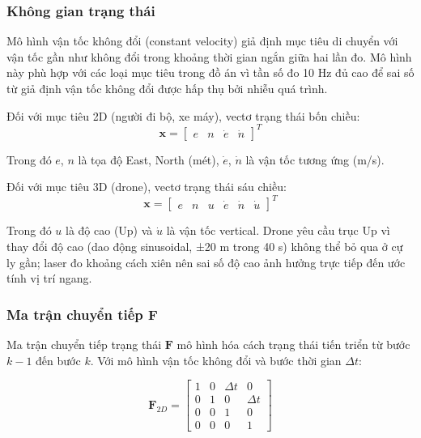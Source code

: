 \subsubsection{Không gian trạng thái}

\hspace{0.5cm} Mô hình vận tốc không đổi (constant velocity) giả định mục tiêu di chuyển với vận tốc gần như không đổi trong khoảng thời gian ngắn giữa hai lần đo. Mô hình này phù hợp với các loại mục tiêu trong đồ án vì tần số đo 10 Hz đủ cao để sai số từ giả định vận tốc không đổi được hấp thụ bởi nhiễu quá trình.

Đối với mục tiêu 2D (người đi bộ, xe máy), vectơ trạng thái bốn chiều:
\begin{equation}
    \mathbf{x} = \begin{bmatrix} e & n & \dot{e} & \dot{n} \end{bmatrix}^T
\end{equation}

Trong đó $e$, $n$ là tọa độ East, North (mét), $\dot{e}$, $\dot{n}$ là vận tốc tương ứng (m/s).

Đối với mục tiêu 3D (drone), vectơ trạng thái sáu chiều:
\begin{equation}
    \mathbf{x} = \begin{bmatrix} e & n & u & \dot{e} & \dot{n} & \dot{u} \end{bmatrix}^T
\end{equation}

Trong đó $u$ là độ cao (Up) và $\dot{u}$ là vận tốc vertical. Drone yêu cầu trục Up vì thay đổi độ cao (dao động sinusoidal, ±20 m trong 40 s) không thể bỏ qua ở cự ly gần; laser đo khoảng cách xiên nên sai số độ cao ảnh hưởng trực tiếp đến ước tính vị trí ngang.

\subsubsection{Ma trận chuyển tiếp \texorpdfstring{$\mathbf{F}$}{F}}

\hspace{0.5cm} Ma trận chuyển tiếp trạng thái $\mathbf{F}$ mô hình hóa cách trạng thái tiến triển từ bước $k-1$ đến bước $k$. Với mô hình vận tốc không đổi và bước thời gian $\Delta t$:

\begin{equation}
    \mathbf{F}_{2D} = \begin{bmatrix}
        1 & 0 & \Delta t & 0 \\
        0 & 1 & 0 & \Delta t \\
        0 & 0 & 1 & 0 \\
        0 & 0 & 0 & 1
    \end{bmatrix}
\end{equation}

